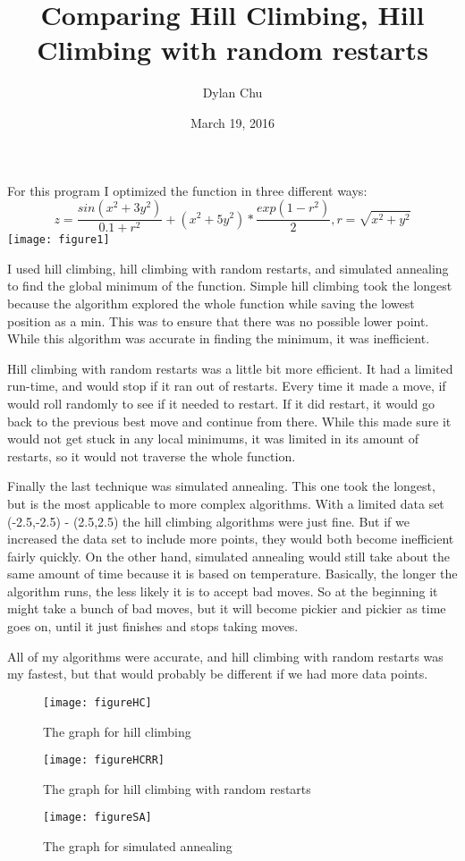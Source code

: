 \documentclass{article}
\title{Comparing Hill Climbing, Hill Climbing with random restarts}
\author{Dylan Chu}
\date{March 19, 2016}
\begin{document}
	\maketitle
   For this program I optimized the function in three different ways:  \[z=\frac{sin(x^2+3y^2)}{0.1+r^2}+(x^2+5y^2)*\frac{exp(1-r^2)}{2},r=\sqrt{x^2 + y^2}\]
   \texttt{[image: figure1]}
   
   I used hill climbing, hill climbing with random restarts, and simulated annealing to find the global minimum of the function.  Simple hill climbing took the longest because the algorithm explored the whole function while saving the lowest position as a min.  This was to ensure that there was no possible lower point.  While this algorithm was accurate in finding the minimum, it was inefficient.
   
   Hill climbing with random restarts was a little bit more efficient.  It had a limited run-time, and would stop if it ran out of restarts.  Every time it made a move, if would roll randomly to see if it needed to restart.  If it did restart, it would go back to the previous best move and continue from there.  While this made sure it would not get stuck in any local minimums, it was limited in its amount of restarts, so it would not traverse the whole function.  
   
   
   Finally the last technique was simulated annealing.  This one took the longest, but is the most applicable to more complex algorithms.  With a limited data set (-2.5,-2.5) - (2.5,2.5) the hill climbing algorithms were just fine.  But if we increased the data set to include more points, they would both become inefficient fairly quickly.  On the other hand, simulated annealing would still take about the same amount of time because it is based on temperature. Basically, the longer the algorithm runs, the less likely it is to accept bad moves.  So at the beginning it might take a bunch of bad moves, but it will become pickier and pickier as time goes on, until it just finishes and stops taking moves.  
   
   All of my algorithms were accurate, and hill climbing with random restarts was my fastest, but that would probably be different if we had more data points.
   

   \begin{figure}[h]
   	\caption{The graph for hill climbing}
   	\centering
   	\texttt{[image: figureHC]}
   \end{figure}
   
      \begin{figure}[h]
      	\caption{The graph for hill climbing with random restarts}
      	\centering
      	\texttt{[image: figureHCRR]}
      \end{figure}
      
         \begin{figure}[h]
         	\caption{The graph for simulated annealing}
         	\centering
         	\texttt{[image: figureSA]}
         \end{figure}
\end{document}
